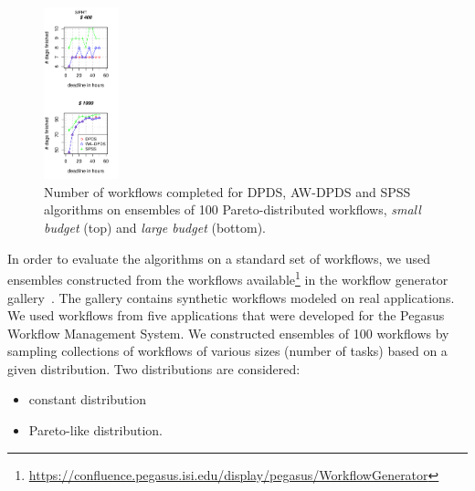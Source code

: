 \documentclass{sig-alternate}
\begin{document}
\begin{figure}[t]
\includegraphics[width=0.19\textwidth]{figures/pareto-SIPHT-n-1000-8-dagh5-50m0.pdf}
\caption{Number of workflows completed for DPDS, AW-DPDS and SPSS
algorithms on ensembles of 100 Pareto-distributed workflows, {\em small budget}
(top) and {\em large budget} (bottom).}
\label{fig:number-complete-pareto}
\end{figure}


In order to evaluate the algorithms on a standard set of workflows, we used
ensembles constructed from the workflows available\footnote{\url{https://confluence.pegasus.isi.edu/display/pegasus/WorkflowGenerator}}
in the workflow generator gallery~\cite{Bharathi08}. The gallery contains synthetic
workflows modeled on real applications. We used workflows from five applications 
that were developed for the Pegasus Workflow Management System. We constructed 
ensembles of 100 workflows by sampling collections of workflows of various sizes
(number of tasks) based on a given distribution. Two distributions are considered:

\begin{itemize}
  \item constant distribution
  \item Pareto-like distribution.
\end{itemize}
\end{document}
